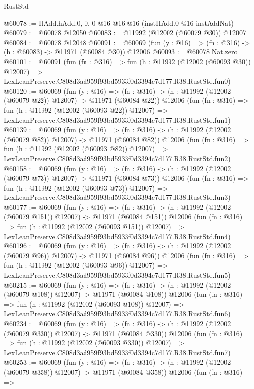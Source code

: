 \begin{lexlean}{RustStd}
\begin{coremodule}
@60078 := HAdd.hAdd.{0, 0, 0} @16 @16 @16 (instHAdd.{0} @16 instAddNat)
@60079 := @60078 @12050
@60083 := @11992 (@12002 (@60079 @30)) @12007
@60084 := @60078 @12048
@60091 := @60069 (fun (y : @16) => (fn : @316) -> (h : @60083) -> @11971 (@60084 @30)) @12006
@60093 := @60078 Nat.zero
@60101 := @60091
    (fun (fn : @316) =>
    fun (h : @11992 (@12002 (@60093 @30)) @12007) =>
    LexLeanPreserve.C808d3ad959f93bd5933f0d3394c7d177.R38.RustStd.fun0)
@60120 := @60069
    (fun (y : @16) =>
    (fn : @316) -> (h : @11992 (@12002 (@60079 @22)) @12007) -> @11971 (@60084 @22))
    @12006
    (fun (fn : @316) =>
    fun (h : @11992 (@12002 (@60093 @22)) @12007) =>
    LexLeanPreserve.C808d3ad959f93bd5933f0d3394c7d177.R38.RustStd.fun1)
@60139 := @60069
    (fun (y : @16) =>
    (fn : @316) -> (h : @11992 (@12002 (@60079 @82)) @12007) -> @11971 (@60084 @82))
    @12006
    (fun (fn : @316) =>
    fun (h : @11992 (@12002 (@60093 @82)) @12007) =>
    LexLeanPreserve.C808d3ad959f93bd5933f0d3394c7d177.R38.RustStd.fun2)
@60158 := @60069
    (fun (y : @16) =>
    (fn : @316) -> (h : @11992 (@12002 (@60079 @73)) @12007) -> @11971 (@60084 @73))
    @12006
    (fun (fn : @316) =>
    fun (h : @11992 (@12002 (@60093 @73)) @12007) =>
    LexLeanPreserve.C808d3ad959f93bd5933f0d3394c7d177.R38.RustStd.fun3)
@60177 := @60069
    (fun (y : @16) =>
    (fn : @316) -> (h : @11992 (@12002 (@60079 @151)) @12007) -> @11971 (@60084 @151))
    @12006
    (fun (fn : @316) =>
    fun (h : @11992 (@12002 (@60093 @151)) @12007) =>
    LexLeanPreserve.C808d3ad959f93bd5933f0d3394c7d177.R38.RustStd.fun4)
@60196 := @60069
    (fun (y : @16) =>
    (fn : @316) -> (h : @11992 (@12002 (@60079 @96)) @12007) -> @11971 (@60084 @96))
    @12006
    (fun (fn : @316) =>
    fun (h : @11992 (@12002 (@60093 @96)) @12007) =>
    LexLeanPreserve.C808d3ad959f93bd5933f0d3394c7d177.R38.RustStd.fun5)
@60215 := @60069
    (fun (y : @16) =>
    (fn : @316) -> (h : @11992 (@12002 (@60079 @108)) @12007) -> @11971 (@60084 @108))
    @12006
    (fun (fn : @316) =>
    fun (h : @11992 (@12002 (@60093 @108)) @12007) =>
    LexLeanPreserve.C808d3ad959f93bd5933f0d3394c7d177.R38.RustStd.fun6)
@60234 := @60069
    (fun (y : @16) =>
    (fn : @316) -> (h : @11992 (@12002 (@60079 @330)) @12007) -> @11971 (@60084 @330))
    @12006
    (fun (fn : @316) =>
    fun (h : @11992 (@12002 (@60093 @330)) @12007) =>
    LexLeanPreserve.C808d3ad959f93bd5933f0d3394c7d177.R38.RustStd.fun7)
@60253 := @60069
    (fun (y : @16) =>
    (fn : @316) -> (h : @11992 (@12002 (@60079 @358)) @12007) -> @11971 (@60084 @358))
    @12006
    (fun (fn : @316) =>

\end{coremodule}
\end{lexlean}

